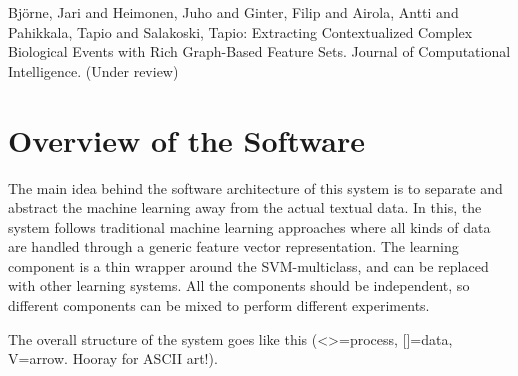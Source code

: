 \documentclass[a4paper,12pt]{article}
\begin{document}
Björne, Jari and Heimonen, Juho and Ginter, Filip and Airola, Antti and Pahikkala, Tapio and Salakoski, Tapio: Extracting Contextualized Complex Biological Events with Rich Graph-Based Feature Sets. Journal of Computational Intelligence. (Under review)

\section{Overview of the Software}

The main idea behind the software architecture of this system is to separate and abstract the machine learning away from the actual textual data. In this, the system follows traditional machine learning approaches where all kinds of data are handled through a generic feature vector representation. The learning component is a thin wrapper around the SVM-multiclass, and can be replaced with other learning systems. All the components should be independent, so different components can be mixed to perform different experiments.

The overall structure of the system goes like this (<>=process, []=data, V=arrow. Hooray for ASCII art!).

% 
% 
% 
% 
% 
\end{document}
